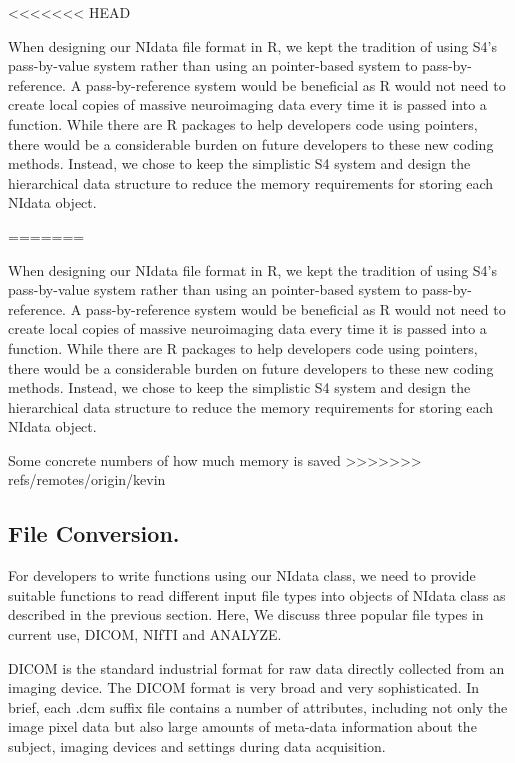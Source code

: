 \documentclass{nature}
\begin{document}
<<<<<<< HEAD

When designing our NIdata file format in R, we kept the tradition of using S4's
pass-by-value system rather than using an pointer-based system to pass-by-reference.
A pass-by-reference system would be beneficial as R would not need to 
create local copies of massive neuroimaging data every time it is passed into a
function. While there are R packages to help developers
code using pointers\cite{bengtsson2003r}, there would be a 
considerable burden on future developers to these new coding methods.
Instead, we chose to keep the simplistic S4 system and design the hierarchical
data structure to reduce the memory requirements for storing each NIdata object.

=======

When designing our NIdata file format in R, we kept the tradition of using S4's
pass-by-value system rather than using an pointer-based system to
pass-by-reference.
A pass-by-reference system would be beneficial as R would not need to 
create local copies of massive neuroimaging data every time it is passed into a
function. While there are R packages to help developers
code using pointers\cite{bengtsson2003r}, there would be a 
considerable burden on future developers to these new coding methods.
Instead, we chose to keep the simplistic S4 system and design the hierarchical
data structure to reduce the memory requirements for storing each NIdata object.

{\color{red}Some concrete numbers of how much memory is saved}
>>>>>>> refs/remotes/origin/kevin

\subsection{File Conversion.}
For developers to write functions using our NIdata class, we need to provide
suitable functions to read different input file types into objects of NIdata
class as described in the previous section. Here, We discuss three popular file
types in current use, DICOM, NIfTI and ANALYZE.

DICOM is the standard industrial
format for raw data directly collected from an imaging device. The DICOM format
is very broad and very sophisticated. In brief, each .dcm suffix file contains a
number of attributes, including not only the image pixel data but also large
amounts of meta-data information about the subject, imaging devices and settings
during data acquisition.
\end{document}
